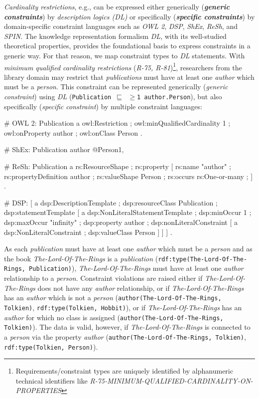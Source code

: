 \documentclass{llncs}
\newcommand{\ms}[1]{\texttt{#1}}
\begin{document}
\emph{Cardinality restrictions}, e.g., can be expressed either generically (\textbf{\emph{generic constraints}}) by \emph{description logics (DL)} 
or specifically (\textbf{\emph{specific constraints}}) by domain-specific constraint languages such as \emph{OWL 2}, \emph{DSP}, \emph{ShEx}, \emph{ReSh}, and \emph{SPIN}.
The knowledge representation formalism {\em DL}, with its  well-studied theoretical properties, provides the foundational basis to express constraints in a generic way. 
For that reason, we map constraint types to \emph{DL} statements.
With \emph{minimum qualified cardinality restrictions} (\emph{R-75, R-81})\footnote{Requirements/constraint types are uniquely identified by alphanumeric technical identifiers like \emph{R-75-MINIMUM-QUALIFIED-CARDINALITY-ON-PROPERTIES}}, researchers from the library domain may restrict
that \emph{publications} must have at least one \emph{author} which must be a \emph{person}.
This constraint can be represented generically (\emph{generic constraint}) using \emph{DL} (\ms{Publication $\sqsubseteq$ $\geq$1 author.Person}), but also specifically (\emph{specific constraint}) by multiple constraint languages:

\begin{ex}
# OWL 2:
Publication
    a owl:Restriction ;
    owl:minQualifiedCardinality 1 ;
    owl:onProperty author ;
    owl:onClass Person .
		
# ShEx:
Publication { author @Person{1, } }

# ReSh:
Publication a rs:ResourceShape ; rs:property [
    rs:name "author" ; rs:propertyDefinition author ;
    rs:valueShape Person ;
    rs:occurs rs:One-or-many ; ] .
		
# DSP:
[   a dsp:DescriptionTemplate ; 
    dsp:resourceClass Publication ; 
    dsp:statementTemplate [ a dsp:NonLiteralStatementTemplate ;
        dsp:minOccur 1 ; dsp:maxOccur "infinity" ; 
        dsp:property author ; 
        dsp:nonLiteralConstraint [ a dsp:NonLiteralConstraint ;
            dsp:valueClass Person ] ] ] .
\end{ex}

As each \emph{publication} must have at least one \emph{author} which must be a \emph{person} 
and as the book \emph{The-Lord-Of-The-Rings} is a \emph{publication} (\ms{rdf:type(The-Lord-Of-The-Rings, Publication)}), 
\emph{The-Lord-Of-The-Rings} must have at least one \emph{author} relationship to a \emph{person}.
Constraint violations are raised either if
\emph{The-Lord-Of-The-Rings} does not have any \emph{author} relationship, or if 
\emph{The-Lord-Of-The-Rings} has an \emph{author} which is not a \emph{person}
(\ms{author(The-Lord-Of-The-Rings, Tolkien)}, \ms{rdf:type(Tolkien, Hobbit)}), 
or if \emph{The-Lord-Of-The-Rings} has an \emph{author} for which no class is assigned
(\ms{author(The-Lord-Of-The-Rings, Tolkien)}).
The data is valid, however, if \emph{The-Lord-Of-The-Rings} is connected to a \emph{person} via the property \emph{author}
(\ms{author(The-Lord-Of-The-Rings, Tolkien)}, \ms{rdf:type(Tolkien, Person)}).
\end{document}

